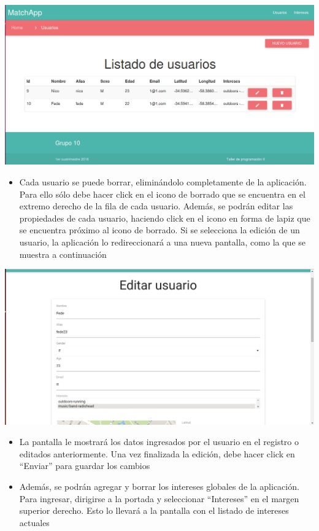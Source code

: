 \documentclass[letterpaper,10pt,english]{sphinxmanual}
\begin{document}
\includegraphics{shared_listadoUsuarios.png}
\begin{itemize}
\item {} 
Cada usuario se puede borrar, eliminándolo completamente de la aplicación. Para ello sólo debe hacer click en el icono de borrado que se encuentra en el extremo derecho de la fila de cada usuario. Además, se podrán editar las propiedades de cada usuario, haciendo click en el icono en forma de lapiz que se encuentra próximo al icono de borrado. Si se selecciona la edición de un usuario, la aplicación lo redireccionará a una nueva pantalla, como la que se muestra a continuación

\end{itemize}

\includegraphics{shared_editUsuarios.png}
\begin{itemize}
\item {} 
La pantalla le mostrará los datos ingresados por el usuario en el registro o editados anteriormente. Una vez finalizada la edición, debe hacer click en ``Enviar'' para guardar los cambios

\item {} 
Además, se podrán agregar y borrar los intereses globales de la aplicación. Para ingresar, dirigirse a la portada y seleccionar ``Intereses'' en el margen superior derecho. Esto lo llevará a la pantalla con el listado de intereses actuales

\end{itemize}
\end{document}
